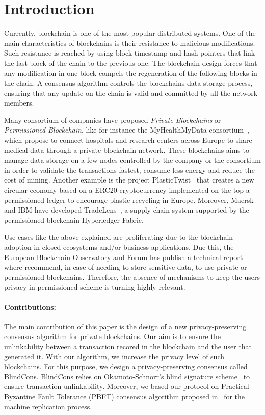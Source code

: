 \documentclass[conference]{IEEEtran}
\newcommand{\name}{BlindCons}
\begin{document}
\section{Introduction} \label{intro}

Currently, blockchain is one of the most popular distributed systems. One of the main characteristics of blockchains is their resistance to malicious modifications. Such resistance is reached by using block timestamp and hash pointers that link the last block of the chain to the previous one. The blockchain design forces that any modification in one block compels the regeneration of the following blocks in the chain. A consensus algorithm controls the blockchains data storage process, ensuring that any update on the chain is valid and committed by all the network members.

Many consortium of companies have proposed \emph{Private Blockchains} or \emph{Permissioned Blockchain}, like for instance the MyHealthMyData  consortium~\cite{MHMD}, which propose to connect hospitals and research centers across Europe to share medical data through a private blockchain network. These blockchains aims to manage data storage on a few nodes controlled by the company or the consortium in order to validate the transactions fastest, consume less energy and reduce the cost of mining. Another example is the project PlasticTwist~\cite{PTWIST} that creates a new circular economy based on a ERC20 cryptocurrency implemented on the top a permissioned ledger to encourage plastic recycling in Europe. Moreover, Maersk and IBM have developed TradeLens~\cite{Tradelens}, a supply chain system supported by the permissioned blockchain Hyperledger Fabric.  

Use cases like the above explained are proliferating due to the blockchain adoption in closed ecosystems and/or business applications. Due this, the European Blockchain Observatory  and Forum has publish a technical report~\cite{BlockchainGDPR} where recommend, in case of needing to store sensitive data, to use private or permissioned blockchains. Therefore, the absence of mechanisms to keep the users privacy in permissioned scheme is turning highly relevant.


\paragraph*{Contributions:} The main contribution of this paper is the design of a new privacy-preserving consensus algorithm for private blockchains. Our aim is to ensure the unlinkability between a transaction recored in the blockchain and the user that generated it. With our algorithm, we increase the privacy level of such blockchains. For this purpose, we design a privacy-preserving consensus called \name{}. \name{} relies on Okamoto-Schnorr's blind signature scheme~\cite{okamoto1992provably} to ensure transaction unlinkability. Moreover, we based our protocol on Practical Byzantine Fault Tolerance (PBFT) consensus algorithm proposed in~\cite{castro1999practical} for the machine replication process.
\end{document}

